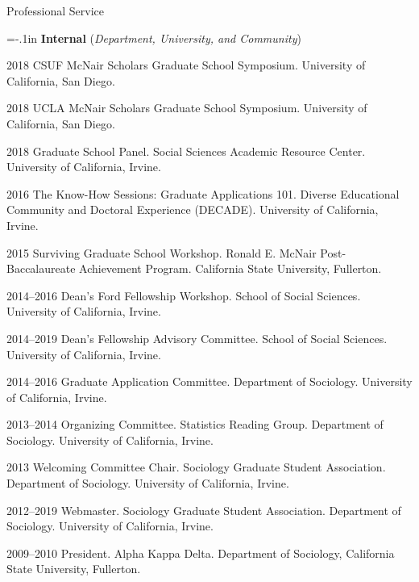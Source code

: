 \begin{rSection}{Professional Service}
\vspace{1em}



{\parindent=-.1in \bf Internal} (\textit{Department, University, and Community})

\begin{hangt}{2018 \datefill}
CSUF McNair Scholars Graduate School Symposium. University of California, San Diego.
\end{hangt}
\begin{hangt}{2018 \datefill}
UCLA McNair Scholars Graduate School Symposium. University of California, San Diego.
\end{hangt}
\begin{hangt}{2018 \datefill}
Graduate School Panel. Social Sciences Academic Resource Center. University of California, Irvine.
\end{hangt}
\begin{hangt}{2016 \datefill}
The Know-How Sessions: Graduate Applications 101. Diverse Educational Community and Doctoral Experience (DECADE). University of California, Irvine.
\end{hangt}
\begin{hangt}{2015 \datefill}
Surviving Graduate School Workshop. Ronald E. McNair Post-Baccalaureate Achievement Program. California State University, Fullerton.
\end{hangt}
\begin{hangt}{2014--2016}
Dean's Ford Fellowship Workshop. School of Social Sciences. University of California, Irvine.
\end{hangt}
\begin{hangt}{2014--2019}
Dean's Fellowship Advisory Committee. School of Social Sciences. University of California, Irvine.
\end{hangt}
\begin{hangt}{2014--2016}
Graduate Application Committee. Department of Sociology. University of California, Irvine.
\end{hangt}
\begin{hangt}{2013--2014}
Organizing Committee. Statistics Reading Group. Department of Sociology. University of California, Irvine.
\end{hangt}
\begin{hangt}{2013 \datefill}
Welcoming Committee Chair. Sociology Graduate Student Association. Department of Sociology. University of California, Irvine.
\end{hangt}
\begin{hangt}{2012--2019}
Webmaster. Sociology Graduate Student Association. Department of Sociology. University of California, Irvine.
\end{hangt}
\begin{hangt}{2009--2010}
President. Alpha Kappa Delta. Department of Sociology, California State University, Fullerton.
\end{hangt}

\end{rSection}



